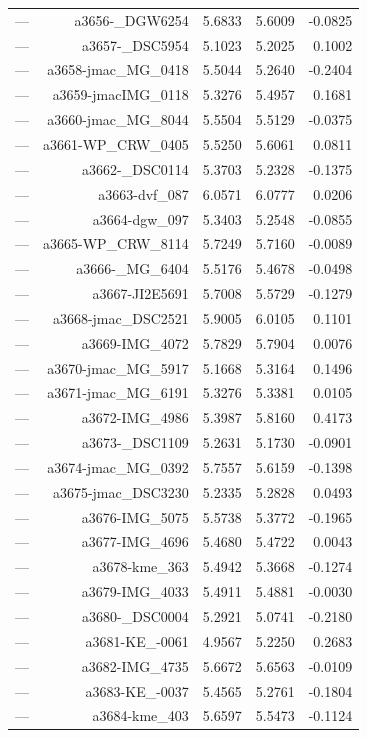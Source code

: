 \begin{table}[htbp]
\begin{tabular}{lrrrr}
— & a3656-_DGW6254 & 5.6833 & 5.6009 & -0.0825 \\
— & a3657-_DSC5954 & 5.1023 & 5.2025 & 0.1002 \\
— & a3658-jmac_MG_0418 & 5.5044 & 5.2640 & -0.2404 \\
— & a3659-jmacIMG_0118 & 5.3276 & 5.4957 & 0.1681 \\
— & a3660-jmac_MG_8044 & 5.5504 & 5.5129 & -0.0375 \\
— & a3661-WP_CRW_0405 & 5.5250 & 5.6061 & 0.0811 \\
— & a3662-_DSC0114 & 5.3703 & 5.2328 & -0.1375 \\
— & a3663-dvf_087 & 6.0571 & 6.0777 & 0.0206 \\
— & a3664-dgw_097 & 5.3403 & 5.2548 & -0.0855 \\
— & a3665-WP_CRW_8114 & 5.7249 & 5.7160 & -0.0089 \\
— & a3666-_MG_6404 & 5.5176 & 5.4678 & -0.0498 \\
— & a3667-JI2E5691 & 5.7008 & 5.5729 & -0.1279 \\
— & a3668-jmac_DSC2521 & 5.9005 & 6.0105 & 0.1101 \\
— & a3669-IMG_4072 & 5.7829 & 5.7904 & 0.0076 \\
— & a3670-jmac_MG_5917 & 5.1668 & 5.3164 & 0.1496 \\
— & a3671-jmac_MG_6191 & 5.3276 & 5.3381 & 0.0105 \\
— & a3672-IMG_4986 & 5.3987 & 5.8160 & 0.4173 \\
— & a3673-_DSC1109 & 5.2631 & 5.1730 & -0.0901 \\
— & a3674-jmac_MG_0392 & 5.7557 & 5.6159 & -0.1398 \\
— & a3675-jmac_DSC3230 & 5.2335 & 5.2828 & 0.0493 \\
— & a3676-IMG_5075 & 5.5738 & 5.3772 & -0.1965 \\
— & a3677-IMG_4696 & 5.4680 & 5.4722 & 0.0043 \\
— & a3678-kme_363 & 5.4942 & 5.3668 & -0.1274 \\
— & a3679-IMG_4033 & 5.4911 & 5.4881 & -0.0030 \\
— & a3680-_DSC0004 & 5.2921 & 5.0741 & -0.2180 \\
— & a3681-KE_-0061 & 4.9567 & 5.2250 & 0.2683 \\
— & a3682-IMG_4735 & 5.6672 & 5.6563 & -0.0109 \\
— & a3683-KE_-0037 & 5.4565 & 5.2761 & -0.1804 \\
— & a3684-kme_403 & 5.6597 & 5.5473 & -0.1124 \\

\end{tabular}
\end{table}

